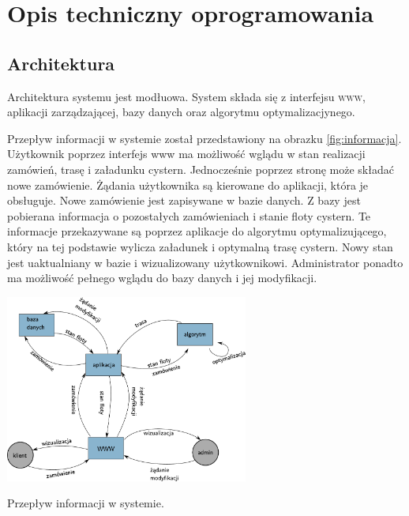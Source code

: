 \documentclass[11pt,a4paper,oneside]{mwart}
\begin{document}

\section{Opis techniczny oprogramowania}
\subsection{Architektura}
Architektura systemu jest modłuowa. System składa się z interfejsu \textsc{www}, aplikacji zarządzającej, bazy danych oraz algorytmu optymalizacjynego.

Przepływ informacji w systemie został przedstawiony na obrazku \ref{fig:informacja}. Użytkownik poprzez interfejs www ma możliwość wglądu w stan realizacji zamówień, trasę i załadunku cystern. Jednocześnie poprzez stronę może składać nowe zamówienie. Żądania użytkownika są kierowane do aplikacji, która je obsługuje. Nowe zamówienie jest zapisywane w bazie danych. Z bazy jest pobierana informacja o pozostałych zamówieniach i stanie floty cystern. Te informacje przekazywane są poprzez aplikacje do algorytmu optymalizującego, który na tej podstawie wylicza załadunek i optymalną trasę cystern.  Nowy stan jest uaktualniany w bazie i wizualizowany użytkownikowi.
Administrator ponadto ma możliwość pełnego wglądu do bazy danych i jej modyfikacji.

\begin{schemat}
  \centering
  \includegraphics[width=0.6\textwidth]{pics/przep_inf.pdf}
  \caption{Przepływ informacji w systemie.}
  \label{fig:informacja}
\end{schemat}
\end{document}
